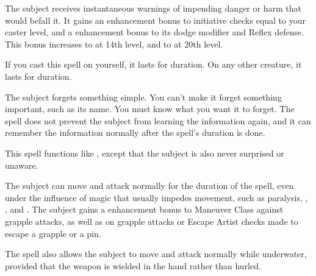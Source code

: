 \begin{spelleffect} 
    The subject receives instantaneous warnings of impending danger or harm that would befall it. It gains an enhancement bonus to initiative checks equal to your caster level, and a  enhancement bonus to its dodge modifier and Reflex defense. This bonus increases to  at 14th level, and to  at 20th level.
  \par If you cast this spell on yourself, it lasts for \durlong duration. On any other creature, it lasts for \durshort duration.
\end{spelleffect}

\spellrng{\rngmed}
\spelldur{\durlong}
\begin{spelleffect}
    The subject forgets something simple. You can't make it forget something important, such as its name. You must know what you want it to forget. The spell does not prevent the subject from learning the information again, and it can remember the information normally after the spell's duration is done.
\end{spelleffect}

\begin{spelleffect}
    This spell functions like , except that the subject is also never surprised or unaware.
\end{spelleffect}

\spellrng{\rngtouch}
\spelldur{\durshort}
\begin{spelleffect}
  The subject can move and attack normally for the duration of the spell, even under the influence of magic that usually impedes movement, such as paralysis, , , and . The subject gains a  enhancement bonus to Maneuver Class against grapple attacks, as well as on grapple attacks or Escape Artist checks made to escape a grapple or a pin.
  \par The spell also allows the subject to move and attack normally while underwater, provided that the weapon is wielded in the hand rather than hurled.
\end{spelleffect}

